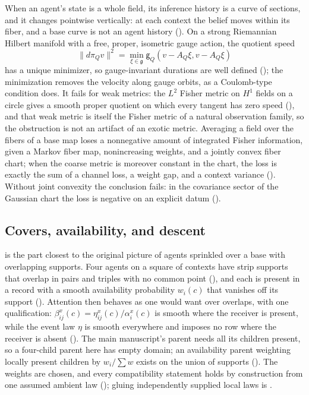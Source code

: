 When an agent's state is a whole field, its inference history is a curve of sections, and it changes
pointwise vertically: at each context the belief moves within its fiber, and a base curve is not an
agent history (). On a strong Riemannian Hilbert manifold with
a free, proper, isometric gauge action, the quotient speed
\[
\lVert d\pi_Qv\rVert^2=\min_{\xi\in\mathfrak g}\mathsf g_Q(v-A_Q\xi,v-A_Q\xi)
\]
has a unique minimizer, so gauge-invariant durations are well defined
(); the minimization removes the velocity along gauge orbits, as a
Coulomb-type condition does. It fails for weak metrics: the \(L^2\) Fisher metric on \(H^1\) fields on a
circle gives a smooth proper quotient on which every tangent has zero speed
(), and that weak metric is itself the Fisher metric of a
natural observation family, so the obstruction is not an artifact of an exotic metric. Averaging a field
over the fibers of a base map loses a nonnegative amount of integrated Fisher information, given a Markov
fiber map, nonincreasing weights, and a jointly convex fiber chart; when the coarse metric is moreover
constant in the chart, the loss is exactly the sum of a channel loss, a weight gap, and a context variance
(). Without joint convexity the conclusion fails: in the covariance sector of
the Gaussian chart the loss is negative on an explicit datum ().

\subsection{Covers, availability, and descent}
\label{comp:sb-covers}

 is the part closest to the original picture of agents sprinkled over a base
with overlapping supports. Four agents on a square of contexts have strip supports that overlap in pairs
and triples with no common point (), and each is present in a record with a smooth
availability probability \(w_i(c)\) that vanishes off its support ().
Attention then behaves as one would want over overlaps, with one qualification:
\(\beta^x_{ij}(c)=\eta^x_{ij}(c)/\alpha^x_i(c)\) is smooth where the receiver is present, while the event
law \(\eta\) is smooth everywhere and imposes no row where the receiver is absent
(). The main manuscript's parent needs all its children present, so a
four-child parent here has empty domain; an availability parent weighting locally present children by
\(w_i/\sum w\) exists on the union of supports (). The weights are chosen,
and every compatibility statement holds by construction from one assumed ambient law
(); gluing independently supplied local laws is
.

